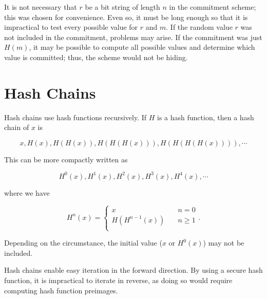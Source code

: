 It is not necessary that $r$ be a bit string of length $n$
in the commitment scheme;
this was chosen for convenience.
Even so, it must be long enough so that it is impractical
to test every possible value for $r$ and $m$.
If the random value $r$ was not included in the commitment,
problems may arise.
If the commitment was just $H(m)$,
it may be possible to compute all possible values
and determine which value is committed;
thus, the scheme would not be hiding.



\section{Hash Chains}

Hash chains use \glspl{hash function} recursively.
If $H$ is a \gls{hash function}, then a hash chain of $x$ is

\begin{equation}
    x, H(x), H(H(x)), H(H(H(x))), H(H(H(H(x)))), \cdots
\end{equation}

\noindent
This can be more compactly written as

\begin{equation}
    H^{0}(x), H^{1}(x), H^{2}(x), H^{3}(x), H^{4}(x), \cdots
\end{equation}

\noindent
where we have

\begin{equation}
    H^{n}(x) = \begin{cases}
            x\quad &n = 0 \\
            H(H^{n-1}(x))\quad &n \ge 1 \\
    \end{cases}.
\end{equation}

\noindent
Depending on the circumstance, the initial value ($x$ or $H^{0}(x)$)
may not be included.

Hash chains enable easy iteration in the forward direction.
By using a secure \gls{hash function}, it is impractical to iterate in reverse,
as doing so would require computing \gls{hash function} preimages.

